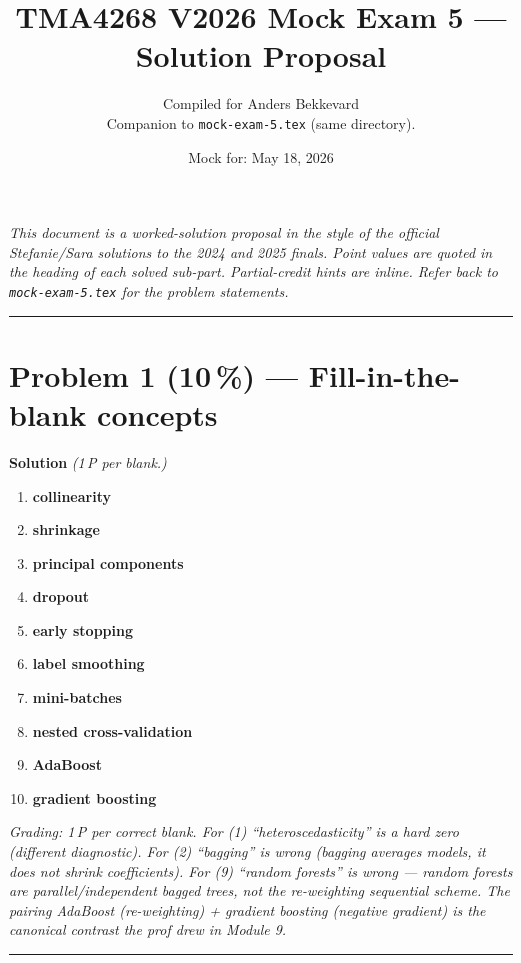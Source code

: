 \documentclass[11pt,a4paper]{article}
\title{TMA4268 V2026 Mock Exam 5 --- Solution Proposal\\[0.3em]
\large}
\author{Compiled for Anders Bekkevard\\[0.2em]
\small Companion to \texttt{mock-exam-5.tex} (same directory).}
\date{Mock for: May 18, 2026}
\newcommand{\points}[1]{\textbf{(#1\,\%)}}
\newcommand{\sol}{\noindent\textbf{Solution}}
\begin{document}
\maketitle

\noindent\textit{This document is a worked-solution proposal in the style of the official Stefanie/Sara solutions
to the 2024 and 2025 finals. Point values are quoted in the heading of each solved sub-part. Partial-credit
hints are inline. Refer back to \texttt{mock-exam-5.tex} for the problem statements.}

\vspace{0.6em}
\hrule
\vspace{1em}

\section*{Problem 1 \points{10} --- Fill-in-the-blank concepts}

\sol{} \emph{(1\,P per blank.)}

\begin{enumerate}[(1)]
  \item \textbf{collinearity}
  \item \textbf{shrinkage}
  \item \textbf{principal components}
  \item \textbf{dropout}
  \item \textbf{early stopping}
  \item \textbf{label smoothing}
  \item \textbf{mini-batches}
  \item \textbf{nested cross-validation}
  \item \textbf{AdaBoost}
  \item \textbf{gradient boosting}
\end{enumerate}

\noindent\emph{Grading: 1\,P per correct blank. For (1) ``heteroscedasticity'' is a hard zero (different
diagnostic). For (2) ``bagging'' is wrong (bagging averages models, it does not shrink coefficients).
For (9) ``random forests'' is wrong --- random forests are parallel/independent bagged trees, not the
re-weighting sequential scheme. The pairing AdaBoost (re-weighting) + gradient boosting (negative
gradient) is the canonical contrast the prof drew in Module 9.}

\vspace{0.6em}
\hrule
\vspace{1em}
\end{document}

